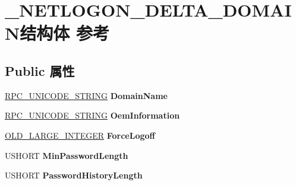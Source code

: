 \hypertarget{struct___n_e_t_l_o_g_o_n___d_e_l_t_a___d_o_m_a_i_n}{}\section{\+\_\+\+N\+E\+T\+L\+O\+G\+O\+N\+\_\+\+D\+E\+L\+T\+A\+\_\+\+D\+O\+M\+A\+I\+N结构体 参考}
\label{struct___n_e_t_l_o_g_o_n___d_e_l_t_a___d_o_m_a_i_n}
\subsection*{Public 属性}
\begin{DoxyCompactItemize}
\item 
\mbox{\label{struct___n_e_t_l_o_g_o_n___d_e_l_t_a___d_o_m_a_i_n_afa96b894573a40615ff4a549c20f4940}} 
\hyperlink{struct___r_p_c___u_n_i_c_o_d_e___s_t_r_i_n_g}{R\+P\+C\+\_\+\+U\+N\+I\+C\+O\+D\+E\+\_\+\+S\+T\+R\+I\+NG} {\bfseries Domain\+Name}
\item 
\mbox{\label{struct___n_e_t_l_o_g_o_n___d_e_l_t_a___d_o_m_a_i_n_aae4e94f7425a21c5e244976f6c78d1b9}} 
\hyperlink{struct___r_p_c___u_n_i_c_o_d_e___s_t_r_i_n_g}{R\+P\+C\+\_\+\+U\+N\+I\+C\+O\+D\+E\+\_\+\+S\+T\+R\+I\+NG} {\bfseries Oem\+Information}
\item 
\mbox{\label{struct___n_e_t_l_o_g_o_n___d_e_l_t_a___d_o_m_a_i_n_aa68c25cc0e934edd5be9347bff2c2fbf}} 
\hyperlink{struct___o_l_d___l_a_r_g_e___i_n_t_e_g_e_r}{O\+L\+D\+\_\+\+L\+A\+R\+G\+E\+\_\+\+I\+N\+T\+E\+G\+ER} {\bfseries Force\+Logoff}
\item 
\mbox{\label{struct___n_e_t_l_o_g_o_n___d_e_l_t_a___d_o_m_a_i_n_a5dbf983b1c10ccffe2be04a9857f6ddc}} 
U\+S\+H\+O\+RT {\bfseries Min\+Password\+Length}
\item 
\mbox{\label{struct___n_e_t_l_o_g_o_n___d_e_l_t_a___d_o_m_a_i_n_ad81a84c4265b193c941fddf344f674bf}} 
U\+S\+H\+O\+RT {\bfseries Password\+History\+Length}
\item 
\mbox{\label{struct___n_e_t_l_o_g_o_n___d_e_l_t_a___d_o_m_a_i_n_aa1db068ea90d10a83832f5f985ef7288}} 

\end{DoxyCompactItemize}

